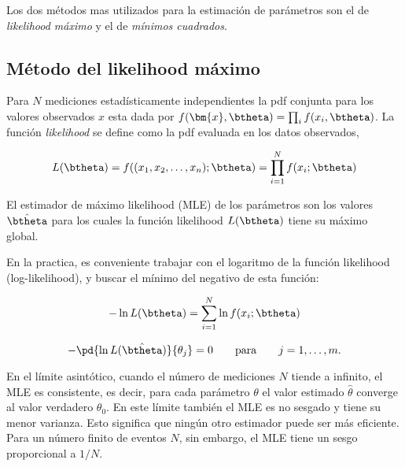 Los dos métodos mas utilizados para la estimación de parámetros son el de
\emph{likelihood máximo} y el de \emph{mínimos cuadrados}.


\subsection{Método del likelihood máximo}\label{sec:MLE}

Para $N$ mediciones estadísticamente independientes la pdf conjunta para los
valores observados $x$ esta dada por $f(\bm{x}, \btheta) = \prod_i f(x_i,
\btheta)$. La función \emph{likelihood} se define como la pdf evaluada en los
datos observados,

\begin{equation}
  L(\btheta) = f((x_1, x_2, \ldots, x_n); \btheta) = \prod_{i=1}^{N} f(x_i;
  \btheta)
\end{equation}

El estimador de máximo likelihood (MLE) de los parámetros {\btheta} son los
valores $\hat{\btheta}$ para los cuales la función likelihood $L(\btheta)$ tiene
su máximo global. %

En la practica, es conveniente trabajar
con el logaritmo de la función likelihood (log-likelihood), y buscar el mínimo
del negativo de esta función:

\begin{equation}
  - \ln L(\btheta) = \sum_{i=1}^{N} \ln f(x_i; \btheta)
\end{equation}

\begin{equation}
  - \pd{\ln L(\hat{\btheta})}{\theta_j} = 0 \qquad \text{para} \qquad j =
  1,\ldots,m.
\end{equation}

En el límite asintótico, cuando el número de mediciones $N$ tiende a infinito,
el MLE es consistente, es decir, para cada parámetro $\theta$ el valor estimado
$\hat{\theta}$ converge al valor verdadero $\theta_0$. En este límite también el
MLE es no sesgado y tiene su menor varianza. Esto significa que ningún otro
estimador puede ser más eficiente. Para un número finito de eventos $N$, sin
embargo, el MLE tiene un sesgo proporcional a $1/N$.

